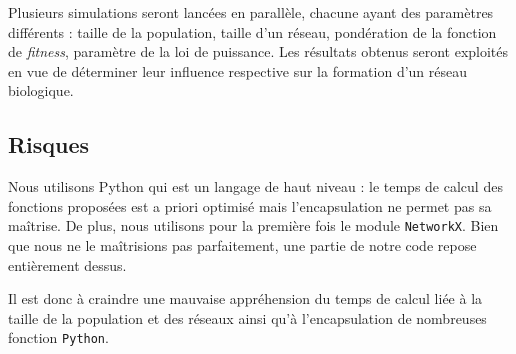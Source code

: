 Plusieurs simulations seront lancées en parallèle, chacune ayant des paramètres différents : taille de la population, taille d'un réseau, pondération de la fonction de \textit{fitness}, paramètre de la loi de puissance. Les résultats obtenus seront exploités en vue de déterminer leur influence respective sur la formation d'un réseau biologique.

\subsection{Risques}
Nous utilisons Python qui est un langage de haut niveau : le temps de calcul des fonctions proposées est a priori optimisé mais l'encapsulation ne permet pas sa maîtrise. De plus, nous utilisons pour la première fois le module \verb?NetworkX?. Bien que nous ne le ma\^itrisions pas parfaitement, une partie de notre code repose entièrement dessus.

Il est donc à craindre une mauvaise appréhension du temps de calcul liée à la taille de la population et des réseaux ainsi qu'à l'encapsulation de nombreuses fonction \verb?Python?.


